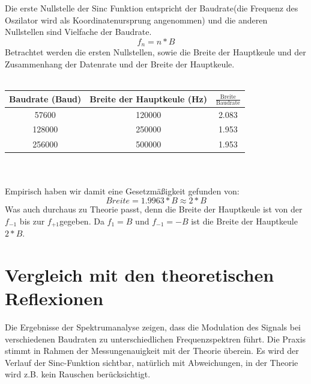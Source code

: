 Die erste Nullstelle der Sinc Funktion entspricht der Baudrate(die Frequenz des Oszilator wird als Koordinatenursprung angenommen)
und die anderen Nullstellen sind Vielfache der Baudrate.
\begin{equation}
    f_n = n * B
\end{equation}
Betrachtet werden die ersten Nullstellen, sowie die Breite der Hauptkeule und der Zusammenhang der Datenrate und der Breite der Hauptkeule.
\\
\\
\begin{tabular}{|c|c|c|}
    \hline
    Baudrate (Baud) & Breite der Hauptkeule (Hz)& $\frac{\text{Breite}}{\text{Baudrate}}$  \\
    \hline
    57600 & 120000 & 2.083 \\
    128000 & 250000 & 1.953 \\
    256000 & 500000 & 1.953 \\
    \hline
\end{tabular}
\\
\\
Empirisch haben wir damit eine Gesetzmäßigkeit gefunden von:
\begin{equation}
    Breite = 1.9963 * B \approx 2 * B
\end{equation}
Was auch durchaus zu Theorie passt, denn die Breite der Hauptkeule ist von der $f_{-1}$ bis zur $f_{+1}$gegeben.
Da $f_{1} = B$ und $f_{-1} = -B$ ist die Breite der Hauptkeule $2 * B$.

\section{Vergleich mit den theoretischen Reflexionen}
Die Ergebnisse der Spektrumanalyse zeigen, dass die Modulation des Signals bei verschiedenen Baudraten zu unterschiedlichen Frequenzspektren führt. Die Praxis stimmt in Rahmen der Messungenauigkeit mit der Theorie überein.
Es wird der Verlauf der Sinc-Funktion sichtbar, natürlich mit Abweichungen, in der Theorie wird z.B. kein Rauschen berücksichtigt.
\clearpage